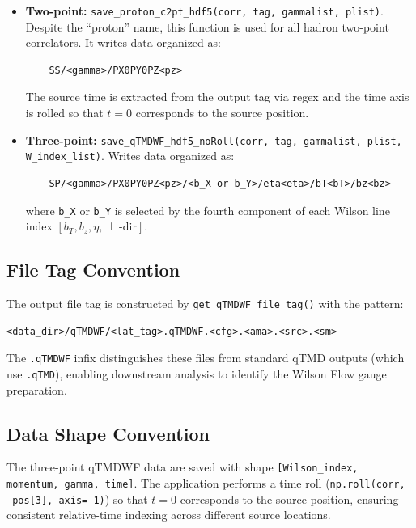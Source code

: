 \documentclass[11pt]{article}
\begin{document}
\begin{itemize}
    \item \textbf{Two-point:} \texttt{save\_proton\_c2pt\_hdf5(corr, tag, gammalist, plist)}. Despite the ``proton'' name, this function is used for all hadron two-point correlators. It writes data organized as:
    \begin{verbatim}
    SS/<gamma>/PX0PY0PZ<pz>
    \end{verbatim}
    The source time is extracted from the output tag via regex and the time axis is rolled so that $t=0$ corresponds to the source position.

    \item \textbf{Three-point:} \texttt{save\_qTMDWF\_hdf5\_noRoll(corr, tag, gammalist, plist, W\_index\_list)}. Writes data organized as:
    \begin{verbatim}
    SP/<gamma>/PX0PY0PZ<pz>/<b_X or b_Y>/eta<eta>/bT<bT>/bz<bz>
    \end{verbatim}
    where \texttt{b\_X} or \texttt{b\_Y} is selected by the fourth component of each Wilson line index $[b_T, b_z, \eta, \perp\text{-dir}]$.
\end{itemize}

\subsection{File Tag Convention}

The output file tag is constructed by \texttt{get\_qTMDWF\_file\_tag()} with the pattern:

\begin{verbatim}
<data_dir>/qTMDWF/<lat_tag>.qTMDWF.<cfg>.<ama>.<src>.<sm>
\end{verbatim}

The \texttt{.qTMDWF} infix distinguishes these files from standard qTMD outputs (which use \texttt{.qTMD}), enabling downstream analysis to identify the Wilson Flow gauge preparation.

\subsection{Data Shape Convention}

The three-point qTMDWF data are saved with shape \texttt{[Wilson\_index, momentum, gamma, time]}. The application performs a time roll (\texttt{np.roll(corr, -pos[3], axis=-1)}) so that $t=0$ corresponds to the source position, ensuring consistent relative-time indexing across different source locations.
\end{document}
